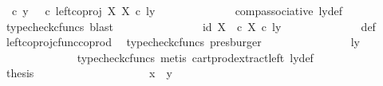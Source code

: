 \begin{isabellebody}
\ {\isachardoublequoteopen}{\isasymrho}\ {\isasymcirc}\isactrlsub c\ y\ {\isacharequal}{\kern0pt}\ {\isacharparenleft}{\kern0pt}{\isasymrho}\ {\isasymcirc}\isactrlsub c\ left{\isacharunderscore}{\kern0pt}coproj\ X\ X{\isacharparenright}{\kern0pt}\ {\isasymcirc}\isactrlsub c\ ly{\isachardoublequoteclose}\isanewline
\ \ \ \ \ \ \ \ \ \ \ \ \isamarkupfalse%
\ comp{\isacharunderscore}{\kern0pt}associative{}\ ly{\isacharunderscore}{\kern0pt}def\ \isamarkupfalse%
\ {\isacharparenleft}{\kern0pt}typecheck{\isacharunderscore}{\kern0pt}cfuncs{\isacharcomma}{\kern0pt}\ blast{\isacharparenright}{\kern0pt}\isanewline
\ \ \ \ \ \ \ \ \ \ \isamarkupfalse%
\ \isamarkupfalse%
\ {\isachardoublequoteopen}{\isachardot}{\kern0pt}{\isachardot}{\kern0pt}{\isachardot}{\kern0pt}\ {\isacharequal}{\kern0pt}\ {\isasymlangle}id\ X{\isacharcomma}{\kern0pt}\ {\isasymt}\ {\isasymcirc}\isactrlsub c\ {\isasymbeta}\isactrlbsub X\isactrlesub {\isasymrangle}\ {\isasymcirc}\isactrlsub c\ ly{\isachardoublequoteclose}\isanewline
\ \ \ \ \ \ \ \ \ \ \ \ \isamarkupfalse%
\ {\isasymrho}{\isacharunderscore}{\kern0pt}def\ \ \isamarkupfalse%
\ left{\isacharunderscore}{\kern0pt}coproj{\isacharunderscore}{\kern0pt}cfunc{\isacharunderscore}{\kern0pt}coprod\ \isamarkupfalse%
\ {\isacharparenleft}{\kern0pt}typecheck{\isacharunderscore}{\kern0pt}cfuncs{\isacharcomma}{\kern0pt}\ presburger{\isacharparenright}{\kern0pt}\isanewline
\ \ \ \ \ \ \ \ \ \ \isamarkupfalse%
\ \isamarkupfalse%
\ {\isachardoublequoteopen}{\isachardot}{\kern0pt}{\isachardot}{\kern0pt}{\isachardot}{\kern0pt}\ {\isacharequal}{\kern0pt}\ {\isasymlangle}ly{\isacharcomma}{\kern0pt}\ {\isasymt}{\isasymrangle}{\isachardoublequoteclose}\isanewline
\ \ \ \ \ \ \ \ \ \ \ \ \isamarkupfalse%
\ {\isacharparenleft}{\kern0pt}typecheck{\isacharunderscore}{\kern0pt}cfuncs{\isacharcomma}{\kern0pt}\ metis\ cart{\isacharunderscore}{\kern0pt}prod{\isacharunderscore}{\kern0pt}extract{\isacharunderscore}{\kern0pt}left\ ly{\isacharunderscore}{\kern0pt}def{\isacharparenright}{\kern0pt}\isanewline
\ \ \ \ \ \ \ \ \ \ \isamarkupfalse%
\ \isamarkupfalse%
\ {\isacharquery}{\kern0pt}thesis\isacommand{{\isachardot}{\kern0pt}}\isamarkupfalse%
\isanewline
\ \ \ \ \ \ \ \ \isamarkupfalse%
\isanewline
\ \ \ \ \ \ \ \ \isamarkupfalse%
\ \isamarkupfalse%
\ {\isachardoublequoteopen}x\ {\isacharequal}{\kern0pt}\ y{\isachardoublequoteclose}\isanewline

\end{isabellebody}
